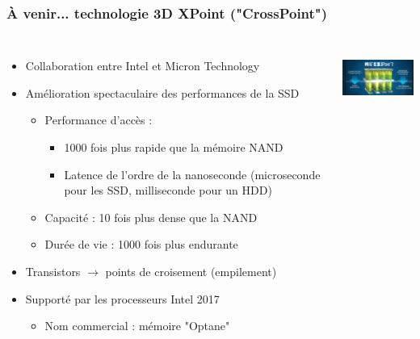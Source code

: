 \begin{frame}
\frametitle{À venir... technologie 3D XPoint ("CrossPoint") \cite{XPoint}}
\begin{columns}
  \begin{itemize}
    \item Collaboration entre Intel et Micron Technology
    \item Amélioration spectaculaire des performances de la SSD
    \begin{itemize}
      \item Performance d'accès :
      \begin{itemize}
        \item 1000 fois plus rapide que la mémoire NAND
        \item Latence de l'ordre de la nanoseconde (microseconde pour les SSD, milliseconde pour un HDD)
      \end{itemize}

      \item Capacité : 10 fois plus dense que la NAND
      \item Durée de vie : 1000 fois plus endurante
    \end{itemize}
    \item Transistors $\rightarrow$  points de croisement (empilement)
    \item Supporté par les processeurs Intel 2017
    \begin{itemize}
      \item Nom commercial : mémoire "Optane"
    \end{itemize}
  \end{itemize}
  \includegraphics[height=2cm]{../illustration/XPoint.jpg}
\end{columns}
\end{frame}

